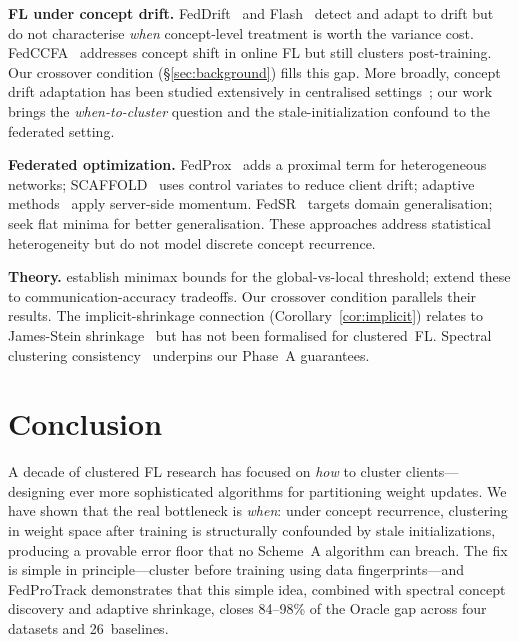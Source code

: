 \documentclass[11pt]{article}
\begin{document}
\textbf{FL under concept drift.}
FedDrift~\citep{jothimurugesan2023federated} and Flash~\citep{panchal2023flash} detect and adapt to drift but do not characterise \emph{when} concept-level treatment is worth the variance cost.
FedCCFA~\citep{chen2024fedccfa} addresses concept shift in online FL but still clusters post-training.
Our crossover condition (\S\ref{sec:background}) fills this gap.
More broadly, concept drift adaptation has been studied extensively in centralised settings~\citep{gama2014survey, lu2018learning}; our work brings the \emph{when-to-cluster} question and the stale-initialization confound to the federated setting.

\textbf{Federated optimization.}
FedProx~\citep{li2020federated} adds a proximal term for heterogeneous networks; SCAFFOLD~\citep{karimireddy2020scaffold} uses control variates to reduce client drift; adaptive methods~\citep{reddi2021adaptive, wu2023faster} apply server-side momentum.
FedSR~\citep{nguyen2022fedsr} targets domain generalisation; \citet{caldarola2022improving} seek flat minima for better generalisation.
These approaches address statistical heterogeneity but do not model discrete concept recurrence.

\textbf{Theory.}
\citet{chen2023minimax} establish minimax bounds for the global-vs-local threshold; \citet{yu2025minimax} extend these to communication-accuracy tradeoffs.
Our crossover condition parallels their results.
The implicit-shrinkage connection (Corollary~\ref{cor:implicit}) relates to James-Stein shrinkage~\citep{james1961estimation, efron1973stein, fedstein2024} but has not been formalised for clustered~FL.
Spectral clustering consistency~\citep{lei2015consistency, loffler2021optimality, von2007tutorial} underpins our Phase~A guarantees.


\section{Conclusion}
\label{sec:conclusion}

A decade of clustered FL research has focused on \emph{how} to cluster clients---designing ever more sophisticated algorithms for partitioning weight updates.
We have shown that the real bottleneck is \emph{when}: under concept recurrence, clustering in weight space after training is structurally confounded by stale initializations, producing a provable error floor that no Scheme~A algorithm can breach.
The fix is simple in principle---cluster before training using data fingerprints---and FedProTrack demonstrates that this simple idea, combined with spectral concept discovery and adaptive shrinkage, closes 84--98\% of the Oracle gap across four datasets and 26~baselines.
\end{document}
